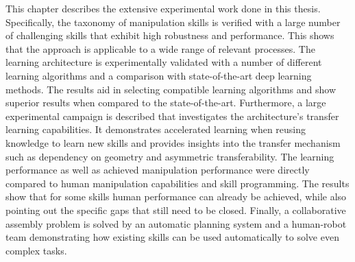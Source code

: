 This chapter describes the extensive experimental work done in this thesis.
Specifically, the taxonomy of manipulation skills is verified with a large number of challenging skills that exhibit high robustness and performance.
This shows that the approach is applicable to a wide range of relevant processes.
The learning architecture is experimentally validated with a number of different learning algorithms and a comparison with state-of-the-art deep learning methods.
The results aid in selecting compatible learning algorithms and show superior results when compared to the state-of-the-art.
Furthermore, a large experimental campaign is described that investigates the architecture’s transfer learning capabilities.
It demonstrates accelerated learning when reusing knowledge to learn new skills and provides insights into the transfer mechanism such as dependency on geometry and asymmetric transferability.
The learning performance as well as achieved manipulation performance were directly compared to human manipulation capabilities and skill programming. The results show that for some skills human performance can already be achieved, while also pointing out the specific gaps that still need to be closed.
Finally, a collaborative assembly problem is solved by an automatic planning system and a human-robot team demonstrating how existing skills can be used automatically to solve even complex tasks.
